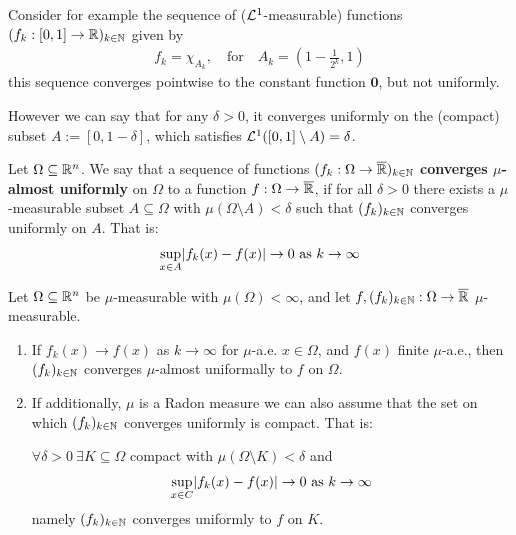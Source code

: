 Consider for example the sequence of ($\mathcal{L}^{1}$-measurable) functions $(f_k: [0,1] \to \mathbb{R})_{k \in \mathbb{N}}$ given by
\begin{align*}
  f_k = \chi_{A_k}, \quad \text{for} \quad A_{k} = \left(1 - \frac{1}{2^{k}},1\right)
\end{align*}
this sequence converges pointwise to the constant function $\bm{0}$, but not uniformly.

However we can say that for any $\delta > 0$, it converges uniformly on the (compact) subset $A := [0,1 - \delta]$, which satisfies $\mathcal{L}^{1}([0,1] \setminus A) = \delta$.


\begin{dfn}[]
  Let $\Omega \subseteq \mathbb{R}^{n}$.
  We say that a sequence of functions $(f_k: \Omega \to \overline{\mathbb{R}})_{k \in \mathbb{N}}$ \textbf{converges $\mu$-almost uniformly} on $\Omega$ to a function $f: \Omega \to \overline{\mathbb{R}}$,
if for all $\delta > 0$ there exists a $\mu$-measurable subset $A \subseteq \Omega$ with $\mu(\Omega \setminus A) < \delta$ such that $(f_k)_{k \in \mathbb{N}}$ converges uniformly on $A$.
That is:
\begin{align*}
  \sup_{x \in A} \abs{f_k(x) - f(x)} \to  0 \text{ as } k \to  \infty
\end{align*}
\end{dfn}


\begin{thm}[Egoroff]
  Let $\Omega \subseteq \mathbb{R}^{n}$ be $\mu$-measurable with $\mu(\Omega) < \infty$,
  and let
  $f,(f_k)_{k \in \mathbb{N}}: \Omega \to \overline{\mathbb{R}}$ $\mu$-measurable.
  \begin{enumerate}
    \item 
      If $f_k(x) \to  f(x)$ as $k \to  \infty$ for $\mu$-a.e. $x \in \Omega$, and $f(x)$ finite $\mu$-a.e., 
      then $(f_k)_{k \in \mathbb{N}}$ converges $\mu$-almost uniformally to $f$ on $\Omega$.
    \item 
      If additionally, $\mu$ is a Radon measure we can also assume that the set on which $(f_k)_{k \in \mathbb{N}}$ converges uniformly is compact.
      That is:

      $\forall \delta > 0\ \exists K \subseteq \Omega$ compact with $\mu(\Omega \setminus K) < \delta$ and
      \begin{align*}
        \sup_{x \in C} \abs{f_k(x) - f(x)} \to 0 \text{ as } k \to  \infty
      \end{align*}
      namely $(f_k)_{k \in \mathbb{N}}$ converges uniformly to $f$ on $K$.
  \end{enumerate}
\end{thm}


